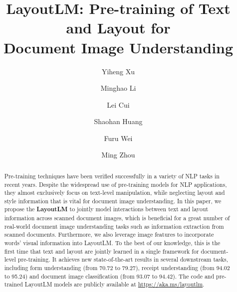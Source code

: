\documentclass[sigconf]{acmart}
\begin{document}
\fancyhead{}
\title{LayoutLM: Pre-training of Text and Layout for \\ Document Image Understanding}

















\author{Yiheng Xu}

\author{Minghao Li}
\authornotemark[1]

\author{Lei Cui}

\author{Shaohan Huang}

\author{Furu Wei}

\author{Ming Zhou}




\begin{abstract}
  Pre-training techniques have been verified successfully in a variety of NLP tasks in recent years. Despite the widespread use of pre-training models for NLP applications, they almost exclusively focus on text-level manipulation, while neglecting layout and style information that is vital for document image understanding. In this paper, we propose the \textbf{LayoutLM} to jointly model interactions between text and layout information across scanned document images, which is beneficial for a great number of real-world document image understanding tasks such as information extraction from scanned documents. Furthermore, we also leverage image features to incorporate words' visual information into LayoutLM. To the best of our knowledge, this is the first time that text and layout are jointly learned in a single framework for document-level pre-training. It achieves new state-of-the-art results in several downstream tasks, including form understanding (from 70.72 to 79.27), receipt understanding (from 94.02 to 95.24) and document image classification (from 93.07 to 94.42). The code and pre-trained LayoutLM models are publicly available at \url{https://aka.ms/layoutlm}.
\end{abstract}
\end{document}
